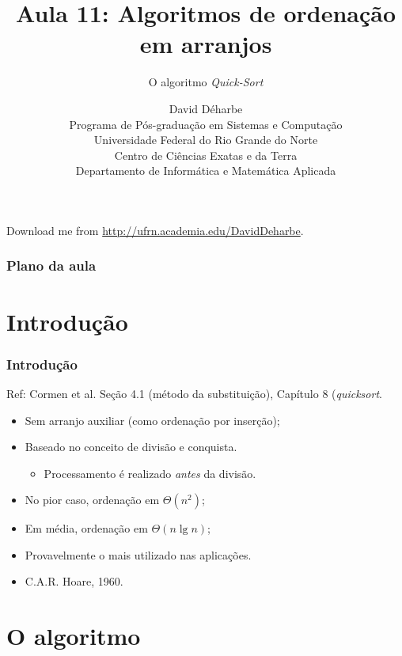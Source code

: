 \documentclass{beamer}
\title{Aula 11: Algoritmos de ordenação em arranjos}
\subtitle{O algoritmo \textit{Quick-Sort\/}}
\author{David Déharbe \\
  Programa de Pós-graduação em Sistemas e Computação \\
  Universidade Federal do Rio Grande do Norte \\
  Centro de Ciências Exatas e da Terra \\
  Departamento de Informática e Matemática Aplicada}
\date{}
\begin{document}
\begin{frame}
  \titlepage
  Download me from \url{http://ufrn.academia.edu/DavidDeharbe}.
\end{frame}

\begin{frame}
  \frametitle{Plano da aula}
  \tableofcontents
\end{frame}

\section{Introdução}

\begin{frame}
  \frametitle{Introdução}

  Ref: Cormen et al. Seção 4.1 (método da substituição), Capítulo 8 (\textit{quicksort}.

  \begin{itemize}
    \item Sem arranjo auxiliar (como ordenação por inserção);
    \item Baseado no conceito de divisão e conquista.
      \begin{itemize}
        \item Processamento é realizado \emph{antes\/} da divisão.
      \end{itemize}
    \item No pior caso, ordenação em $\Theta(n^2)$;
    \item Em média, ordenação em $\Theta(n \lg n)$;
    \item Provavelmente o mais utilizado nas aplicações.
      \pause
    \item C.A.R. Hoare, 1960.
  \end{itemize}

\end{frame}

\section{O algoritmo}
\end{document}
